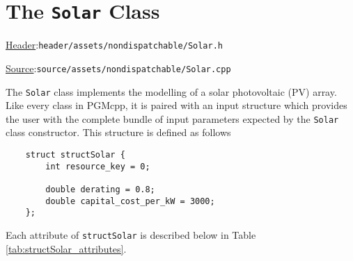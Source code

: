 \documentclass[12pt, letterpaper]{report}
\begin{document}
\section{The \texttt{Solar} Class}

\begin{large}
\noindent\underline{Header}:\quad\texttt{header/assets/nondispatchable/Solar.h}\par
\noindent\underline{Source}:\quad\texttt{source/assets/nondispatchable/Solar.cpp}\par
\end{large}
\vspace{5mm}

The \texttt{Solar} class implements the modelling of a solar photovoltaic (PV) array. Like every class in PGMcpp, it is paired with an input structure which provides the user with the complete bundle of input parameters expected by the \texttt{Solar} class constructor. This structure is defined as follows

\begin{verbatim}
    struct structSolar {
        int resource_key = 0;
        
        double derating = 0.8;
        double capital_cost_per_kW = 3000;
    };
\end{verbatim}

\noindent Each attribute of \texttt{structSolar} is described below in Table \ref{tab:structSolar_attributes}.

\begin{table}[H]
    \centering
    \caption{\texttt{structSolar} attribute descriptions}
    \label{tab:structSolar_attributes}
\end{table}
\end{document}
